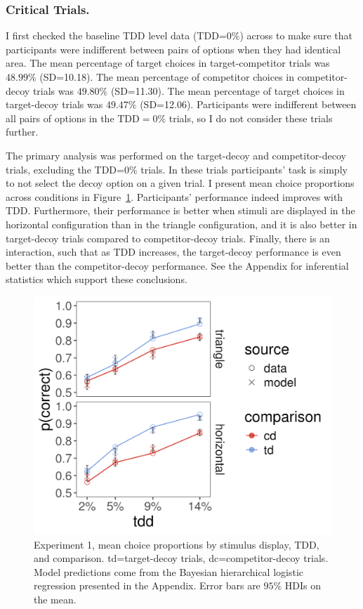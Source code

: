 \subsubsection{Critical Trials.}
I first checked the baseline TDD level data (TDD=$0\%$) across to make sure that participants were indifferent between pairs of options when they had identical area. The mean percentage of target choices in target-competitor trials was $48.99\%$ (SD=10.18). The mean percentage of competitor choices in competitor-decoy trials was $49.80\%$ (SD=11.30). The mean percentage of target choices in target-decoy trials was $49.47\%$ (SD=12.06). Participants were indifferent between all pairs of options in the $\text{TDD}=0\%$ trials, so I do not consider these trials further.

The primary analysis was performed on the target-decoy and competitor-decoy trials, excluding the TDD=$0\%$ trials. In these trials participants' task is simply to not select the decoy option on a given trial. I present mean choice proportions across conditions in Figure~\ref{fig:e1_data}. Participants' performance indeed improves with TDD. Furthermore, their performance is better when stimuli are displayed in the horizontal configuration than in the triangle configuration, and it is also better in target-decoy trials compared to competitor-decoy trials. Finally, there is an interaction, such that as TDD increases, the target-decoy performance is even better than the competitor-decoy performance. See the Appendix for inferential statistics which support these conclusions.

\begin{figure}
   \includegraphics[width=\textwidth]{figures/m14_model_preds_v_data.jpeg}
   \caption{Experiment 1, mean choice proportions by stimulus display, TDD, and comparison. td=target-decoy trials, dc=competitor-decoy trials. Model predictions come from the Bayesian hierarchical logistic regression presented in the Appendix. Error bars are $95\%$ HDIs on the mean.}
   \label{fig:e1_data}
\end{figure}

